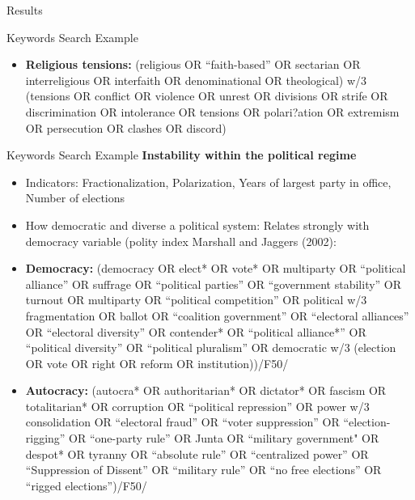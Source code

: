 \documentclass[aspectratio=169,10pt]{beamer}
\begin{document}
\begin{section}[Results]{Results}
\begin{frame}{Keywords Search Example}
\begin{itemize}
\item \textbf{Religious tensions:}
(religious OR “faith-based” OR sectarian OR interreligious OR interfaith OR denominational OR theological) w/3 (tensions OR conflict OR violence OR unrest OR divisions OR strife OR discrimination OR intolerance OR tensions OR polari?ation OR extremism OR persecution OR clashes OR discord)
\end{itemize}

\end{frame}



\begin{frame}{Keywords Search Example}
\textbf{Instability within the political regime}
\scriptsize
\begin{itemize}
\item Indicators: Fractionalization, Polarization, Years of largest party in office, Number of elections
\item How democratic and diverse a political system: Relates strongly with democracy variable (polity index Marshall and Jaggers (2002):
\item \textbf{Democracy:} (democracy OR elect* OR vote* OR multiparty OR “political alliance” OR suffrage OR “political parties” OR “government stability” OR turnout OR multiparty OR “political competition” OR political w/3 fragmentation OR ballot OR “coalition government” OR “electoral alliances” OR “electoral diversity” OR contender* OR “political alliance*” OR “political diversity” OR “political pluralism” OR democratic w/3 (election OR vote OR right OR reform OR institution))/F50/
\item \textbf{Autocracy:} (autocra* OR authoritarian* OR dictator* OR fascism OR totalitarian* OR corruption OR “political repression” OR power w/3 consolidation OR “electoral fraud” OR “voter suppression” OR “election-rigging” OR “one-party rule” OR Junta OR “military government" OR despot* OR tyranny OR “absolute rule” OR “centralized power” OR “Suppression of Dissent” OR “military rule” OR “no free elections” OR “rigged elections”)/F50/

\end{itemize}

\end{frame}




\end{section}
\end{document}
